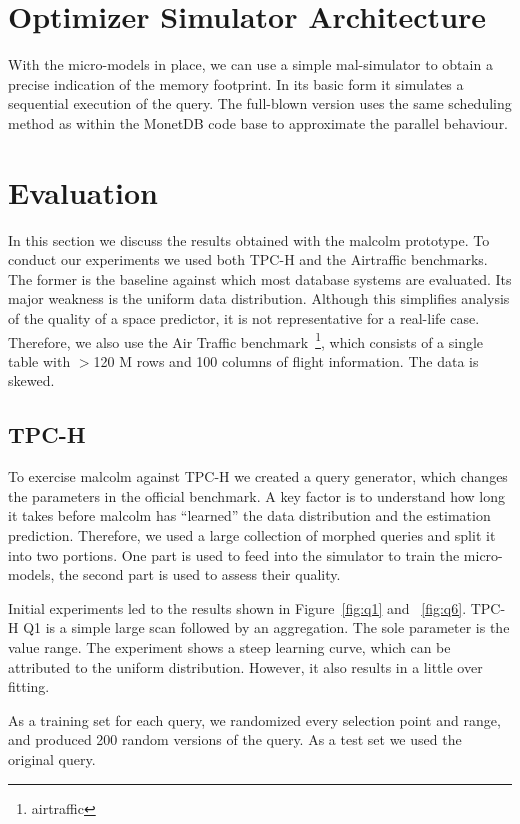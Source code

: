 \documentclass[conference]{IEEEtran}
\begin{document}
\section{Optimizer Simulator Architecture}
With the micro-models in place, we can use a simple {\sc mal}-simulator to obtain a precise indication of the memory footprint.
In its basic form it simulates a sequential execution of the query.
The full-blown version uses the same scheduling method as within the MonetDB code base to approximate the parallel behaviour.

\section{Evaluation}
\label{sec:evaluation}
In this section we discuss the results obtained with the {\sc malcolm} prototype.
To conduct our experiments we used both TPC-H and the Airtraffic benchmarks.
The former is the baseline against which most database systems are evaluated.
Its major weakness is the uniform data distribution.
Although this simplifies analysis of the quality of a space predictor, it is not representative for a real-life case.
Therefore, we also use the Air Traffic benchmark~\footnote{airtraffic}, which consists of a single table with $>$120 M rows and 100 columns of flight information.
The data is skewed.

\subsection{TPC-H}
To exercise {\sc malcolm} against TPC-H we created a query generator, which changes the parameters in the official benchmark.
A key factor is to understand how long it takes before {\sc malcolm} has ``learned'' the data distribution and the estimation prediction.
Therefore, we used a large collection of morphed queries and split it into two portions.
One part is used to feed into the simulator to train the micro-models, the second part is used to assess their quality.

Initial experiments led to the results shown in Figure~\ref{fig:q1} and ~\ref{fig:q6}.
TPC-H Q1 is a simple large scan followed by an aggregation. The sole parameter is the value range.
The experiment shows a steep learning curve, which can be attributed to the uniform distribution.
However, it also results in a little over fitting.

As a training set for each query, we randomized every selection point and range, and produced 200 random versions of the query.
As a test set we used the original query.
\end{document}
